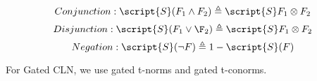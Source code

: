 $$Conjunction: \script{S}(F_{1} \wedge F_{2}) \triangleq \script{S} F_{1} \otimes F_{2}$$
$$Disjunction: \script{S}(F_{1} \lor \F_{2}) \triangleq \script{S} F_{1} \otimes F_{2}$$
$$Negation: \script{S}(\neg{F}) \triangleq 1 - \script{S}(F)$$

For Gated CLN, we use gated t-norms and gated t-conorms.



